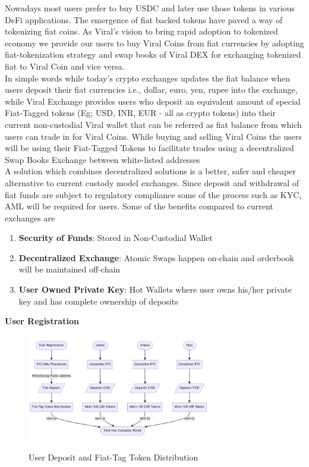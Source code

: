\documentclass[conference]{IEEEtran}
\begin{document}
Nowadays most users prefer to buy USDC and later use those tokens in various DeFi applications. The emergence of fiat backed tokens have paved a way of tokenizing fiat coins. As Viral's vision to bring rapid adoption to tokenized economy we provide our users to buy Viral Coins from fiat currencies by adopting fiat-tokenization strategy and swap books of Viral DEX for exchanging tokenized fiat to Viral Coin and vice versa.\\

In simple words while today's crypto exchanges updates the fiat balance when users deposit their fiat currencies i.e., dollar, euro, yen, rupee into the exchange, while Viral Exchange provides users who deposit an equivalent amount of special Fiat-Tagged tokens (Eg; USD, INR, EUR - all as crypto tokens) into their current non-custodial Viral wallet that can be referred as fiat balance from which users can trade in for Viral Coins. While buying and selling Viral Coins the users will be using their Fiat-Tagged Tokens to facilitate trades using a decentralized Swap Books Exchange between white-listed addresses\\

A solution which combines decentralized solutions is a better, safer and cheaper alternative to current custody model exchanges. Since deposit and withdrawal of fiat funds are subject to regulatory compliance some of the process such as KYC, AML will be required for users. Some of the benefits compared to current exchanges are
\begin{enumerate}[wide, labelwidth=!, labelindent=0pt]
\item \textbf{Security of Funds}: Stored in Non-Custodial Wallet
\item \textbf{Decentralized Exchange}: Atomic Swaps happen on-chain and orderbook will be maintained off-chain
\item \textbf{User Owned Private Key}: Hot Wallets where user owns his/her private key and has complete ownership of deposits
\end{enumerate}

\textbf{User Registration}\\

\begin{figure}[H]
\begin{center}
\includegraphics[width=8cm]{user-deposit}\\
\caption{User Deposit and Fiat-Tag Token Distribution}
\end{center}
\end{figure}
\end{document}
